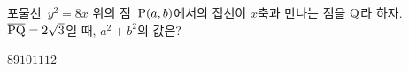 포물선~$y^2=8x$ 위의 점~$\mathrm{P}(a{,}\mkern3mu\mathopen{}b)$에서의 접선이 $x$축과 만나는 점을 $\mathrm{Q}$라 하자. $\overline{\mathrm{PQ}}=2\sqrt{3}$일 때, $a^2+b^2$의 값은?
\begin{choices32}{$8$}{$9$}{$10$}{$11$}{$12$}\end{choices32}
